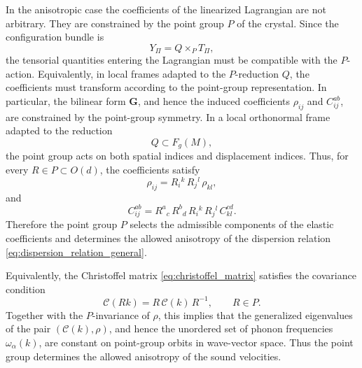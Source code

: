 \documentclass[11pt]{amsart}
\theoremstyle{plain}
\theoremstyle{definition}
\theoremstyle{remark}
\begin{document}
In the anisotropic case the coefficients of the linearized Lagrangian are not arbitrary. 
They are constrained by the point group \(P\) of the crystal. 
Since the configuration bundle is
\[
Y_\Pi=Q\times_P T_\Pi,
\]
the tensorial quantities entering the Lagrangian must be compatible with the \(P\)-action. 
Equivalently, in local frames adapted to the \(P\)-reduction \(Q\), the coefficients must transform according to the point-group representation. 
In particular, the bilinear form \(\mathbf G\), and hence the induced coefficients \(\rho_{ij}\) and \(C^{ab}_{ij}\), are constrained by the point-group symmetry.
In a local orthonormal frame adapted to the reduction
\[
Q\subset F_g(M),
\]
the point group acts on both spatial indices and displacement indices. 
Thus, for every \(R\in P\subset O(d)\), the coefficients satisfy
\begin{equation}
	\rho_{ij}
	=
	R_i{}^k\,R_j{}^l\,\rho_{kl},
	\label{eq:P_invariance_density}
\end{equation}
and
\begin{equation}
	C^{ab}_{ij}
	=
	R^a{}_c\,R^b{}_d\,R_i{}^k\,R_j{}^l\,C^{cd}_{kl}.
	\label{eq:P_invariance_elastic_tensor}
\end{equation}
Therefore the point group \(P\) selects the admissible components of the elastic coefficients and determines the allowed anisotropy of the dispersion relation \eqref{eq:dispersion_relation_general}.

Equivalently, the Christoffel matrix \eqref{eq:christoffel_matrix} satisfies the covariance condition
\begin{equation}
	\mathcal C(Rk)=R\,\mathcal C(k)\,R^{-1},
	\qquad R\in P.
	\label{eq:christoffel_covariance}
\end{equation}
Together with the \(P\)-invariance of \(\rho\), this implies that the generalized eigenvalues of the pair \((\mathcal C(k),\rho)\), and hence the unordered set of phonon frequencies \(\omega_\alpha(k)\), are constant on point-group orbits in wave-vector space. 
Thus the point group determines the allowed anisotropy of the sound velocities.

\medskip
\end{document}
